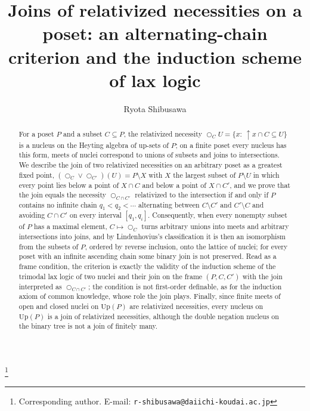 \documentclass[11pt]{amsart}
\theoremstyle{definition}
\newcommand{\Up}{\mathrm{Up}}
\newcommand{\lax}{\bigcirc}
\newcommand{\upa}{{\uparrow}}
\begin{document}
\title[Joins of relativized necessities on a poset]{Joins of relativized necessities on a poset: an alternating-chain criterion and the induction scheme of lax logic}
\author{Ryota Shibusawa}
\thanks{Corresponding author. E-mail: \texttt{r-shibusawa@daiichi-koudai.ac.jp}}
\address{Daiichi Institute of Technology}

\begin{abstract}
For a poset $P$ and a subset $C\subseteq P$, the relativized necessity
$\lax_CU=\{x:\ \upa x\cap C\subseteq U\}$ is a nucleus on the Heyting algebra
of up-sets of $P$; on a finite poset every nucleus has this form, meets of
nuclei correspond to unions of subsets and joins to intersections. We describe
the join of two relativized necessities on an arbitrary poset as a greatest
fixed point, $(\lax_C\vee\lax_{C'})(U)=P\setminus X$ with $X$ the largest
subset of $P\setminus U$ in which every point lies below a point of $X\cap C$
and below a point of $X\cap C'$, and we prove that the join equals the
necessity $\lax_{C\cap C'}$ relativized to the intersection if and only if
$P$ contains no infinite chain $q_1<q_2<\cdots$ alternating between
$C\setminus C'$ and $C'\setminus C$ and avoiding $C\cap C'$ on every interval
$[q_1,q_i]$. Consequently, when every nonempty subset of $P$ has a maximal element,
$C\mapsto\lax_C$ turns arbitrary unions into meets and arbitrary
intersections into joins, and by Lindenhovius's classification it is then an
isomorphism from the subsets of $P$, ordered by reverse inclusion, onto the
lattice of nuclei; for every poset with an infinite ascending chain some
binary join is not preserved. Read as a
frame condition, the criterion is exactly the validity of the induction scheme
of the trimodal lax logic of two nuclei and their join on the frame
$(P,C,C')$ with the join interpreted as $\lax_{C\cap C'}$; the condition is
not first-order definable, as for the induction axiom of common knowledge,
whose role the join plays. Finally, since finite meets of open and closed nuclei on $\Up(P)$ are
relativized necessities, every nucleus on $\Up(P)$ is a join of relativized
necessities, although the double negation nucleus on the binary tree is not
a join of finitely many.
\end{abstract}

\maketitle
\end{document}
